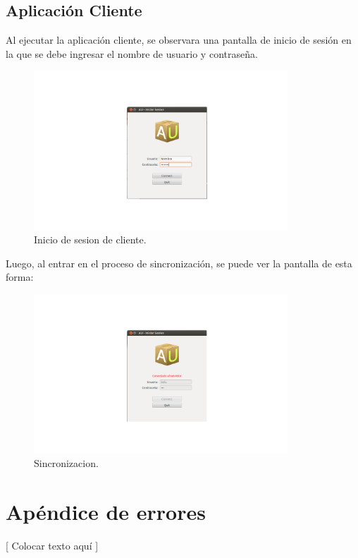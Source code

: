 \documentclass{article}
\begin{document}
\subsection{Aplicación Cliente}
\smallskip
	Al ejecutar la aplicación cliente, se observara una pantalla de inicio de sesión en la que se debe ingresar el nombre de usuario y contraseña. 
	\begin{figure}[h]
       \centering
       \includegraphics[width=0.85\textwidth]{InicioSesionCli.png}
	\bigskip
       \caption{Inicio de sesion de cliente.}
	\end{figure}
	Luego, al entrar en el proceso de sincronización, se puede ver la pantalla de esta forma:
	\begin{figure}[h]
       \centering
       \includegraphics[width=0.85\textwidth]{Sincronizando.png}
	\bigskip
       \caption{Sincronizacion.}
	\end{figure}
\bigskip




\section{Apéndice de errores}
	
	[ Colocar texto aquí ]
\bigskip
\end{document}
